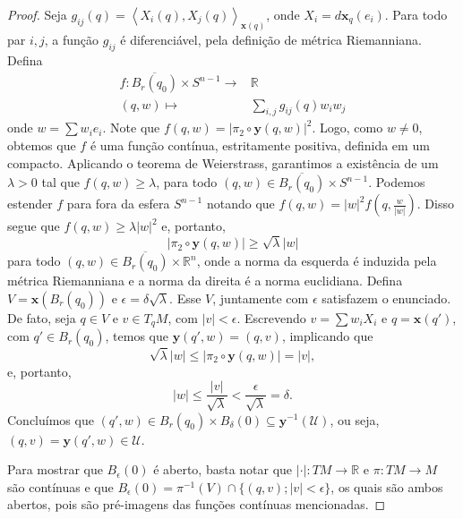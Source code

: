 \begin{lemma}
\begin{proof}
        Seja $g_{ij}(q)=\left< X_{i}(q),X_{j}(q) \right>_{\mathbf{x}(q)}$, onde $X_{i}=d\mathbf{x}_{q}(e_{i})$. Para todo par $i,j$, a função $g_{ij}$ é diferenciável, pela definição de métrica Riemanniana.
        Defina
        \begin{align*}
            f:\overline{B_{r}(q_{0})}\times S^{n-1}\longrightarrow & \mathbb{R}                    \\
            (q, w) \longmapsto                                     & \sum_{i,j}g_{ij}(q)w_{i}w_{j}
        \end{align*}
        onde $w=\sum w_{i}e_{i}$.
        Note que $f(q,w)=|\pi_{2} \circ \mathbf{y}(q,w)|^{2}$. Logo, como $w\neq0$, obtemos que $f$ é uma função contínua, estritamente positiva, definida em um compacto. Aplicando o teorema de Weierstrass, garantimos a existência de um $\lambda>0$ tal que $f(q,w)\geq \lambda$, para todo $(q,w)\in \overline{B_{r}(q_{0})}\times S^{n-1}$.
        Podemos estender $f$ para fora da esfera $S^{n-1}$ notando que $f(q,w)=|w|^{2}f(q,\frac{w}{|w|})$.
        Disso segue que $f(q,w)\geq \lambda|w|^{2}$ e, portanto,
        \begin{equation*}
            |\pi_{2} \circ  \mathbf{y}(q,w)|\geq \sqrt{ \lambda }|w|
        \end{equation*}
        para todo $(q,w) \in \overline{B_{r}(q_{0})}\times \mathbb{R}^{n}$, onde a norma da esquerda é induzida pela métrica Riemanniana e a norma da direita é a norma euclidiana.
        Defina $V=\mathbf{x}(B_{r}(q_{0}))$ e $\epsilon=\delta \sqrt{ \lambda }$. Esse $V$, juntamente com $\epsilon$ satisfazem o enunciado. De fato, seja $q \in V$ e $v \in T_{q}M$, com $|v|<\epsilon$. Escrevendo $v=\sum w_{i}X_{i}$ e $q=\mathbf{x}(q')$, com $q' \in B_{r}(q_{0})$, temos que $\mathbf{y}(q',w)=(q,v)$, implicando que
        \begin{equation*}
            \sqrt{ \lambda }|w|\leq |\pi_{2} \circ  \mathbf{y}(q,w)|=|v|,
        \end{equation*}
        e, portanto,
        \begin{equation*}
            |w|\leq\frac{|v|}{\sqrt{ \lambda }} < \frac{\epsilon}{\sqrt{ \lambda }}=\delta.
        \end{equation*}
        Concluímos que $(q',w)\in B_{r}(q_{0})\times B_{\delta}(0) \subseteq \mathbf{y}^{-1}(\mathcal{U})$, ou seja, $(q,v)=\mathbf{y}(q',w)\in \mathcal{U}$.

        Para mostrar que $B_{\epsilon}(0)$ é aberto, basta notar que $|\cdot|:TM\to \mathbb{R}$ e $\pi:TM\to M$ são contínuas e que $B_{\epsilon}(0)=\pi ^{-1}(V) \cap \{ (q,v); |v|<\epsilon \}$, os quais são ambos abertos, pois são pré-imagens das funções contínuas mencionadas.
    \end{proof}
\end{lemma}

